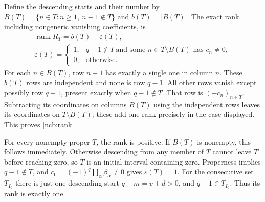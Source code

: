 \documentclass[11pt,a4paper]{article}
\begin{document}
Define the descending starts and their number by
$B(T)=\{n\in T:n\geq1,\ n-1\notin T\}$ and $b(T)=|B(T)|$.
The exact rank, including nongeneric vanishing coefficients, is
\begin{equation}\tag{NCB32}\label{ncb:rank}
\begin{gathered}
\operatorname{rank}R_T=b(T)+\varepsilon(T),\\
\varepsilon(T)=
\begin{cases}
1,&q-1\notin T\ \text{and some }n\in T\setminus B(T)
                                    \text{ has }c_n\ne0,\\
0,&\text{otherwise}.
\end{cases}
\end{gathered}
\end{equation}
For each $n\in B(T)$, row $n-1$ has exactly a single one in column
$n$. These $b(T)$ rows are independent and none is row $q-1$.
All other rows vanish except possibly row $q-1$, present exactly when
$q-1\notin T$. That row is $(-c_n)_{n\in T}$.
Subtracting its coordinates on columns $B(T)$ using the independent
rows leaves its coordinates on $T\setminus B(T)$; these add one rank
precisely in the case displayed. This proves \eqref{ncb:rank}.

For every nonempty proper $T$, the rank is positive. If $B(T)$ is
nonempty, this follows immediately. Otherwise descending from any
member of $T$ cannot leave $T$ before reaching zero, so $T$ is an
initial interval containing zero. Properness implies $q-1\notin T$,
and $c_0=(-1)^q\prod_\alpha\beta_\alpha\ne0$ gives
$\varepsilon(T)=1$. For the consecutive set $T_{I_0}$ there is just
one descending start $q-m=v+d>0$, and $q-1\in T_{I_0}$.
Thus its rank is exactly one.
\end{document}
